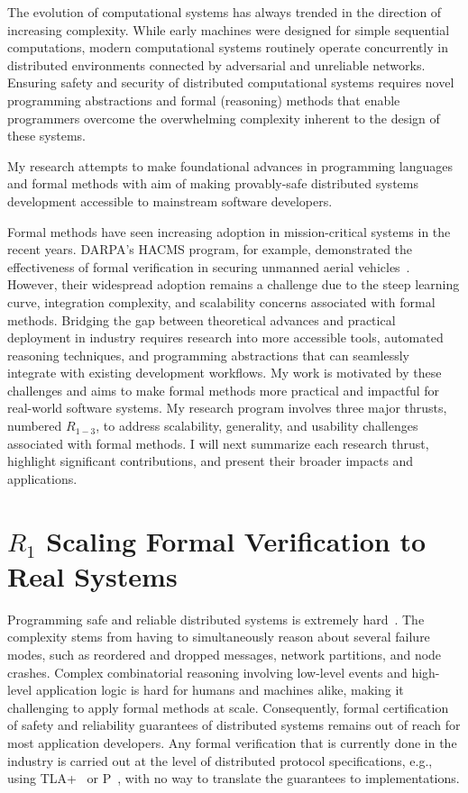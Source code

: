 The evolution of computational systems has always trended in the direction
of increasing complexity. While early machines were designed for simple
sequential computations, modern computational systems routinely operate
concurrently in distributed environments connected by adversarial and
unreliable networks. Ensuring safety and security of distributed
computational systems requires novel programming abstractions and formal
(reasoning) methods that enable programmers overcome the overwhelming
complexity inherent to the design of these systems. 
\begin{mdquote}
My research attempts to make foundational advances in programming languages
and formal methods with aim of making provably-safe distributed systems
development accessible to mainstream software developers.
\end{mdquote}
\noindent Formal methods have seen increasing adoption in mission-critical
systems in the recent years. DARPA's HACMS program, for example,
demonstrated the effectiveness of formal verification in securing unmanned
aerial vehicles~\cite{darpa-hacms}. However, their widespread adoption
remains a challenge due to the steep learning curve, integration
complexity, and scalability concerns associated with formal methods.
Bridging the gap between theoretical advances and practical deployment in
industry requires research into more accessible tools, automated reasoning
techniques, and programming abstractions that can seamlessly integrate with
existing development workflows. My work is motivated by these challenges
and aims to make formal methods more practical and impactful for real-world
software systems. My research program involves three major thrusts,
numbered $R_{1-3}$, to address scalability, generality, and usability
challenges associated with formal methods. I will next summarize each
research thrust, highlight significant contributions, and present their
broader impacts and applications. 

\section*{$R_1$ Scaling Formal Verification to Real Systems}

Programming safe and reliable distributed systems is extremely
hard~\cite{aws-formal,samc,Yu2018}. The complexity stems from having to
simultaneously reason about several failure modes, such as reordered and
dropped messages, network partitions, and node crashes. Complex
combinatorial reasoning involving low-level events and high-level
application logic is hard for humans and machines alike, making it
challenging to apply formal methods at scale. Consequently, formal
certification of safety and reliability guarantees of distributed systems
remains out of reach for most application developers. Any formal
verification that is currently done in the industry is carried out at the
level of distributed protocol specifications, e.g., using TLA+~\cite{tla}
or P~\cite{p-lang}, with no way to translate the guarantees to
implementations.


